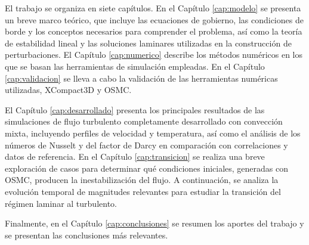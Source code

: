 El trabajo se organiza en siete capítulos. En el Capítulo \ref{cap:modelo} se presenta un breve marco teórico, que incluye las ecuaciones de gobierno, las condiciones de borde y los conceptos necesarios para comprender el problema, así como la teoría de estabilidad lineal y las soluciones laminares utilizadas en la construcción de perturbaciones. El Capítulo \ref{cap:numerico} describe los métodos numéricos en los que se basan las herramientas de simulación empleadas. En el Capítulo \ref{cap:validacion} se lleva a cabo la validación de las herramientas numéricas utilizadas, XCompact3D y OSMC.

El Capítulo \ref{cap:desarrollado} presenta los principales resultados de las simulaciones de flujo turbulento completamente desarrollado con convección mixta, incluyendo perfiles de velocidad y temperatura, así como el análisis de los números de Nusselt y del factor de Darcy en comparación con correlaciones y datos de referencia. En el Capítulo \ref{cap:transicion} se realiza una breve exploración de casos para determinar qué condiciones iniciales, generadas con OSMC, producen la inestabilización del flujo. A continuación, se analiza la evolución temporal de magnitudes relevantes para estudiar la transición del régimen laminar al turbulento.

Finalmente, en el Capítulo \ref{cap:conclusiones} se resumen los aportes del trabajo y se presentan las conclusiones más relevantes.
